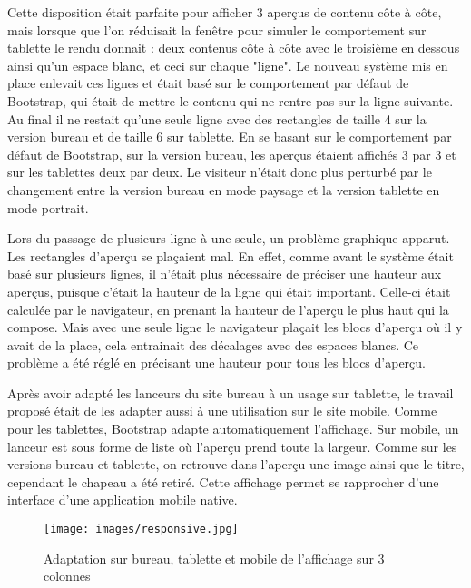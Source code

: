 \documentclass[12pt,a4paper]{article}
\begin{document}
Cette disposition était parfaite pour afficher 3 aperçus de contenu côte à côte, mais lorsque que l'on réduisait la fenêtre pour simuler le comportement sur tablette le rendu donnait : deux contenus côte à côte avec le troisième en dessous ainsi qu'un espace blanc, et ceci sur chaque "ligne". Le nouveau système mis en place enlevait ces lignes et était basé sur le comportement par défaut de Bootstrap, qui était de mettre le contenu qui ne rentre pas sur la ligne suivante. Au final il ne restait qu'une seule ligne avec des rectangles de taille 4 sur la version bureau et de taille 6 sur tablette. En se basant sur le comportement par défaut de Bootstrap, sur la version bureau, les aperçus étaient affichés 3 par 3 et sur les tablettes deux par deux. Le visiteur n'était donc plus perturbé par le changement entre la version bureau en mode paysage et la version tablette en mode portrait.\par
\medskip
Lors du passage de plusieurs ligne à une seule, un problème graphique apparut. Les rectangles d'aperçu se plaçaient mal. En effet, comme avant le système était basé sur plusieurs lignes, il n'était plus nécessaire de préciser une hauteur aux aperçus, puisque c'était la hauteur de la ligne qui était important. Celle-ci était calculée par le navigateur, en prenant la hauteur de l'aperçu le plus haut qui la compose. Mais avec une seule ligne le navigateur plaçait les blocs d'aperçu où il y avait de la place, cela entrainait des décalages avec des espaces blancs. Ce problème a été réglé en précisant une hauteur pour tous les blocs d'aperçu.\par 
\bigskip
Après avoir adapté les lanceurs du site bureau à un usage sur tablette, le travail proposé était de les adapter aussi à une utilisation sur le site mobile. Comme pour les tablettes, Bootstrap adapte automatiquement l'affichage. Sur mobile, un lanceur est sous forme de liste où l'aperçu prend toute la largeur. Comme sur les versions bureau et tablette, on retrouve dans l'aperçu une image ainsi que le titre, cependant le chapeau a été retiré. Cette affichage permet se rapprocher d'une interface d'une application mobile native.\par


\begin{figure}[h!]
\centering\texttt{[image: images/responsive.jpg]} 
\caption{Adaptation sur bureau, tablette et mobile de l'affichage sur 3 colonnes}
\end{figure}
\newpage
\end{document}

